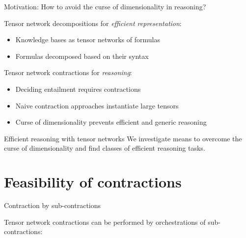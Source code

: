 \documentclass{beamer}
\begin{document}
    {\frame[plain]{\titlepage}}
    \showoutlineatsection


    \begin{frame}{Motivation: How to avoid the curse of dimensionality in reasoning?}

        Tensor network decompositions for \emph{efficient representation}:
        \begin{itemize}
            \item Knowledge bases as tensor networks of formulas
            \item Formulas decomposed based on their syntax
        \end{itemize}
        \medskip
        Tensor network contractions for \emph{reasoning}:
        \begin{itemize}
            \item Deciding entailment requires contractions
            \item Naive contraction approaches instantiate large tensors
            \item Curse of dimensionality prevents efficient and generic reasoning
        \end{itemize}
        \medskip
        \begin{block}{Efficient reasoning with tensor networks}
            We investigate means to overcome the curse of dimensionality and find classes of efficient reasoning tasks. %
        \end{block}
    \end{frame}


    \section{Feasibility of contractions}


    \begin{frame}{Contraction by sub-contractions}

        Tensor network contractions can be performed by orchestrations of sub-contractions:

        


    \end{frame}
\end{document}
